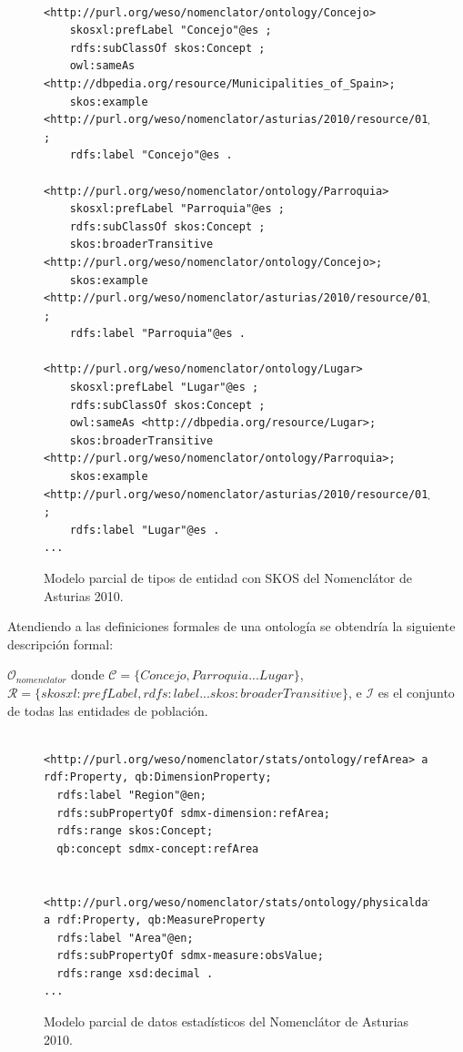\begin{figure}[!htp]
\begin{lstlisting}
 
<http://purl.org/weso/nomenclator/ontology/Concejo> 
	skosxl:prefLabel "Concejo"@es ;
	rdfs:subClassOf skos:Concept ;
	owl:sameAs <http://dbpedia.org/resource/Municipalities_of_Spain>;
	skos:example <http://purl.org/weso/nomenclator/asturias/2010/resource/01/00/00> ;
	rdfs:label "Concejo"@es .
	
<http://purl.org/weso/nomenclator/ontology/Parroquia> 
	skosxl:prefLabel "Parroquia"@es ;
	rdfs:subClassOf skos:Concept ;
	skos:broaderTransitive <http://purl.org/weso/nomenclator/ontology/Concejo>;
	skos:example <http://purl.org/weso/nomenclator/asturias/2010/resource/01/01/00> ;
	rdfs:label "Parroquia"@es .

<http://purl.org/weso/nomenclator/ontology/Lugar> 
	skosxl:prefLabel "Lugar"@es ;
	rdfs:subClassOf skos:Concept ;
	owl:sameAs <http://dbpedia.org/resource/Lugar>;
	skos:broaderTransitive <http://purl.org/weso/nomenclator/ontology/Parroquia>;
	skos:example <http://purl.org/weso/nomenclator/asturias/2010/resource/01/02/05> ;
	rdfs:label "Lugar"@es .
...
\end{lstlisting}
	\caption{Modelo parcial de tipos de entidad con SKOS del Nomenclátor de Asturias 2010.}
	\label{fig:modelo-nomen}
\end{figure}

Atendiendo a las definiciones formales de una ontología se obtendría la siguiente descripción formal:

$\mathcal{O}_{nomenclator}$ donde $\mathcal{C} = \{Concejo, Parroquia...Lugar\}$, $\mathcal{R} = \{skosxl:prefLabel, rdfs:label...skos:broaderTransitive\}$,
e $\mathcal{I}$ es el conjunto de todas las entidades de población.

\begin{figure}[!htp]
\begin{lstlisting}
 
<http://purl.org/weso/nomenclator/stats/ontology/refArea> a rdf:Property, qb:DimensionProperty;
  rdfs:label "Region"@en;
  rdfs:subPropertyOf sdmx-dimension:refArea;
  rdfs:range skos:Concept;
  qb:concept sdmx-concept:refArea 
	

<http://purl.org/weso/nomenclator/stats/ontology/physicaldata/area> a rdf:Property, qb:MeasureProperty
  rdfs:label "Area"@en;
  rdfs:subPropertyOf sdmx-measure:obsValue;
  rdfs:range xsd:decimal .
...
\end{lstlisting}
	\caption{Modelo parcial de datos estadísticos del Nomenclátor de Asturias 2010.}
	\label{fig:modelo-nomen-stats}
\end{figure}


